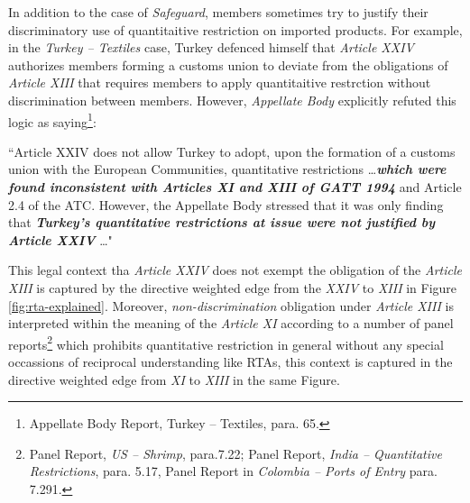 In addition to the case of \textit{Safeguard}, 
members sometimes try to justify their discriminatory 
use of quantitaitive restriction on imported products. For example, in the \textit{Turkey – Textiles} case, Turkey defenced himself that \textit{Article XXIV} authorizes
members forming a customs union to deviate from the obligations of \textit{Article XIII} that requires members to apply quantitaitive restrction without discrimination between members. 
However, \textit{Appellate Body} explicitly refuted this logic as saying\footnote{Appellate Body Report, Turkey – Textiles, para. 65.}:
\begin{displayquote}[][]
    ``Article XXIV does not allow Turkey to adopt, upon the
    formation of a customs union with the European Communities, quantitative restrictions \ldots \textbf{\textit{which
    were found inconsistent with Articles XI and XIII of GATT 1994}} and Article 2.4 of the ATC.
    However, the Appellate Body stressed that it was only finding that \textbf{\textit{Turkey's quantitative
    restrictions at issue were not justified by Article XXIV}} \ldots"
\end{displayquote}
This legal context tha \textit{Article XXIV} does not exempt the obligation of the \textit{Article XIII} is captured by the directive weighted edge from the \textit{XXIV} to \textit{XIII} in Figure \ref{fig:rta-explained}.
Moreover, \textit{non-discrimination} obligation under \textit{Article XIII} is interpreted within the meaning of the \textit{Article XI} according to a number of panel reports\footnote{Panel Report, \textit{US – Shrimp}, para.7.22;  Panel Report, \textit{India – Quantitative Restrictions}, para. 5.17, Panel Report in \textit{Colombia – Ports of Entry} para. 7.291.  } which prohibits quantitative restriction in general without any special occassions of reciprocal understanding like RTAs,
this context is captured in the directive weighted edge from \textit{XI} to \textit{XIII} in the same Figure.  
